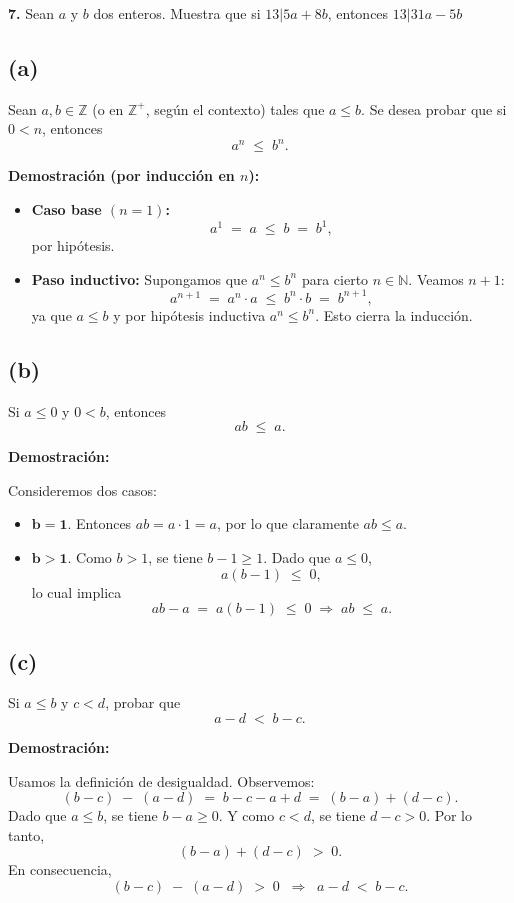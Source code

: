 \documentclass[12pt]{article}
\begin{document}
%
%
\textbf{7.} Sean $a$ y $b$ dos enteros. Muestra que si $13 | 5a + 8b$, entonces $13|31a - 5b$\\
\subsection*{(a)}
Sean \(a,b \in \mathbb{Z}\) (o en \(\mathbb{Z}^+\), según el contexto) tales que \(a \leq b\). Se desea probar que si \(0<n\), entonces
\[
a^n \;\leq\; b^n.
\]

\noindent
\textbf{Demostración (por inducción en \(n\)):}
\begin{itemize}
    \item \textbf{Caso base \((n=1)\):}  
    \[
    a^1 \;=\; a \;\leq\; b \;=\; b^1,
    \]
    por hipótesis.

    \item \textbf{Paso inductivo:} 
    Supongamos que \(a^n \leq b^n\) para cierto \(n \in \mathbb{N}\). Veamos \(n+1\):
    \[
    a^{n+1} \;=\; a^n \cdot a \;\leq\; b^n \cdot b \;=\; b^{n+1},
    \]
    ya que \(a \leq b\) y por hipótesis inductiva \(a^n \leq b^n\). Esto cierra la inducción.
\end{itemize}

\subsection*{(b)}
Si \(a \leq 0\) y \(0 < b\), entonces
\[
ab \;\leq\; a.
\]

\noindent
\textbf{Demostración:} 

Consideremos dos casos:
\begin{itemize}
    \item \(\mathbf{b=1}.\) Entonces \(ab = a \cdot 1 = a\), por lo que claramente \(ab \leq a\).
    \item \(\mathbf{b>1}.\) Como \(b>1\), se tiene \(b-1 \geq 1\). Dado que \(a \leq 0\), 
    \[
    a(b-1) \;\leq\; 0,
    \]
    lo cual implica 
    \[
    ab - a \;=\; a(b-1) \;\leq\; 0 
    \;\Longrightarrow\;
    ab \;\leq\; a.
    \]
\end{itemize}

\subsection*{(c)}
Si \(a \leq b\) y \(c < d\), probar que 
\[
a - d \;<\; b - c.
\]

\noindent
\textbf{Demostración:} 

Usamos la definición de desigualdad. Observemos:
\[
(b - c) \;-\; (a - d) \;=\; b - c - a + d \;=\; (b - a) + (d - c).
\]
Dado que \(a \leq b\), se tiene \(b - a \geq 0\). Y como \(c < d\), se tiene \(d - c > 0\). Por lo tanto,
\[
(b-a) + (d-c) \;>\; 0.
\]
En consecuencia,
\[
(b - c) \;-\; (a - d) \;>\; 0
\;\;\Longrightarrow\;\;
a - d \;<\; b - c.
\]
\end{document}
